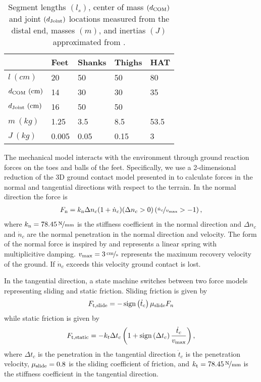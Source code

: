 \begin{table}[b]
  \centering
      \begin{tabular}{lllll}
        \toprule
        & Feet & Shanks & Thighs & HAT \\
        \midrule
        $l         \ (\unit{cm})$ & 20    & 50   & 50   & 80   \\
        $d_\tn{COM}   \ (\unit{cm})$ & 14    & 30   & 30   & 35   \\
        $d_\tn{Joint} \ (\unit{cm})$ & 16    & 50   & 50   &      \\
        $m         \ (\unit{kg})$ & 1.25  & 3.5  & 8.5  & 53.5 \\
        $J         \ (\unit{kg})$ & 0.005 & 0.05 & 0.15 & 3    \\
        \bottomrule
      \end{tabular}
  \caption{Segment lengths $(l_s)$, center of mass $(d_{\textnormal{COM}})$ and joint
  $(d_{\textnormal{Joint}})$ locations measured from the distal end, masses $(m)$, and
  inertias $(J)$ approximated from
  \citet{gunther2003synthesis}.}\label{tab:model_mech_params}
\end{table}

The mechanical model interacts with the environment through ground reaction
forces on the toes and balls of the feet. Specifically, we use a 2-dimensional
reduction of the 3D ground contact model presented in
\citet{song2013generalization} to calculate forces in the normal and
tangential directions with respect to the terrain. In the normal direction the
force is
\begin{align}
    F_{\textnormal{n}} = k_{\textnormal{n}} \Delta n_c (1 + \dot n_c) (\Delta n_c > 0)
    \left(\nicefrac{\dot n_c}{v_{\textnormal{max}}} > -1 \right),
    \label{eq:grf_n}
\end{align}
where $k_\tn{n} = \unitfrac[78.45]{N}{mm}$ is the stiffness coefficient in
the normal direction and $\Delta n_c$ and $\dot n_c$ are the normal penetration
in the normal direction and velocity. The form of the normal force is inspired
by \citet{gunther2003synthesis, scott1993biomechanical} and represents a linear
spring with multiplicitive damping.  $v_\tn{max} = \unitfrac[3]{cm}{s}$ represents
the maximum recovery velocity of the ground. If $\dot n_c$ exceeds this
velocity ground contact is lost.

In the tangential direction, a state machine switches between two force models
representing sliding and static friction. Sliding friction is given by
\begin{align}
    F_{\tn{t,slide}} = -\func{sign}{\dot t_c} \mu_\tn{slide} F_n
\end{align}
while static friction is given by
\begin{align}
    F_{\tn{t,static}} = -k_t \Delta t_c \left(1 + \func{sign}{\Delta t_c}
    \frac{\dot t_c}{v_\tn{max}} \right),
\end{align}
where $\Delta t_c$ is the penetration in the tangential direction $\dot t_c$ is
the penetration velocity, $\mu_{\textnormal{slide}} = 0.8$ is the sliding coefficient of
friction, and $k_\tn{t} =\unitfrac[78.45]{N}{mm}$ is the stiffness coefficient
in the tangential direction.

